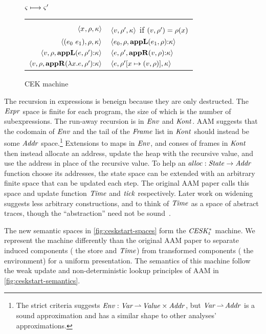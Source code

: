 \begin{figure}
  \centering
  $\varsigma \longmapsto \varsigma'$ \\
  \begin{tabular}{r|l}
    \hline\vspace{-3mm}\\
    $\langle x^{{}}, \rho, \kappa \rangle$
    &
    $\langle v, \rho', \kappa \rangle$ if $(v,\rho') = \rho(x)$
    \\
    $\langle (e_{0}\ e_{1}){},\rho,\kappa \rangle$
    &
    $\langle e_{0},\rho,\mathbf{appL}(e_{1},\rho){\tt :} \kappa \rangle$
    \\
    $\langle v,\rho, \mathbf{appL}(e,\rho'){\tt :} \kappa \rangle$
    &
    $\langle e,\rho',\mathbf{appR}(v,\rho){\tt :} \kappa \rangle$
    \\
    $\langle v,\rho,\mathbf{appR}(\lambda{} x. e,\rho'){\tt :} \kappa \rangle$
    &
    $\langle e,\rho'[x\mapsto(v,\rho)],\kappa \rangle$
  \end{tabular}
  \caption{CEK machine}
  \label{fig:cek-semantics}
\end{figure}

The recursion in expressions is beneign because they are only destructed. The $\mathit{Expr}$ space is finite for each program, the size of which is the number of subexpressions.
%
The run-away recursion is in $\mathit{Env}$ and $\mathit{Kont}$.
%
AAM suggests that the codomain of $\mathit{Env}$ and the tail of the $\mathit{Frame}$ list in $\mathit{Kont}$ should instead be some $\mathit{Addr}$ space.\footnote{The strict criteria suggests $\mathit{Env} : \mathit{Var} \operatorname*{\rightharpoonup} \mathit{Value} \times \mathit{Addr}$, but $\mathit{Var} \operatorname*{\rightharpoonup} \mathit{Addr}$ is a sound approximation and has a similar shape to other analyses' approximations.}
%
Extensions to maps in $\mathit{Env}$, and conses of frames in $\mathit{Kont}$ then instead allocate an address, update the heap with the recursive value, and use the address in place of the recursive value.
%
To help an $\mathit{alloc} : \mathit{State} \to \mathit{Addr}$ function choose its addresses, the state space can be extended with an arbitrary finite space that can be updated each step.
%
The original AAM paper calls this space and update function $\mathit{Time}$ and $\mathit{tick}$ respectively.
%
Later work on widening~\citep{ianjohnson:DBLP:conf/vmcai/HardekopfWCK14} suggests less arbitrary constructions, and to think of $\mathit{Time}$ as a space of abstract traces, though the ``abstraction'' need not be sound~\citep{dvanhorn:Might2009Posteriori}.

The new semantic spaces in \autoref{fig:ceskstart-spaces} form the $\mathit{CESK^*_t}$ machine.
%
We represent the machine differently than the original AAM paper to separate induced components (\eg{} the store and $\mathit{Time}$) from transformed components (\eg{} the environment) for a uniform presentation.
%
The semantics of this machine follow the weak update and non-deterministic lookup principles of AAM in \autoref{fig:ceskstart-semantics}.

